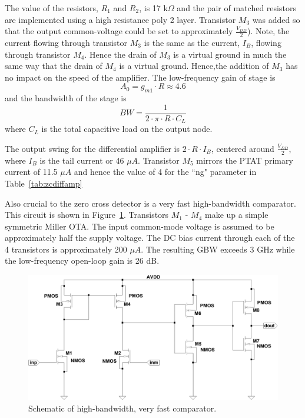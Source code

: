 \documentclass[12pt,oneside,final]{siuethesis}
\theoremstyle{definition}
\begin{document}
The value of the resistors, $R_1$ and $R_2$, is 17 k$\Omega$ and the pair of matched resistors are implemented using a high resistance poly 2 layer. Transistor $M_3$ was added so that the output common-voltage could be set to approximately $\frac{V_{DD}}{2}$). Note, the current flowing through transistor $M_3$ is the same as the current, $I_B$, flowing through transistor $M_4$. Hence the drain of $M_3$ is a virtual ground in much the same way that the drain of $M_4$ is a virtual ground. Hence,the addition of $M_3$ has no impact on the speed of the amplifier. The low-frequency gain of stage is
\begin{equation}
A_0 = g_{m1} \cdot R \approx 4.6
\end{equation}
and the bandwidth of the stage is 
\begin{equation}
BW = \frac{1}{2 \cdot \pi \cdot R \cdot C_L}
\end{equation}
where $C_L$ is the total capacitive load on the output node. 
\par The output swing for the differential amplifier is $ 2 \cdot R \cdot I_B$, centered around $\frac{V_{DD}}{2}$, where $I_B$ is the tail current or 46 $\mu A$.  Transistor $M_5$ mirrors the PTAT primary current of 11.5 $\mu A$ and hence the value of 4 for the ``ng" parameter in Table~\ref{tab:zcdiffamp}
\par Also crucial to the zero cross detector is a very fast high-bandwidth comparator. This circuit is shown in Figure~\ref{fig:zccomp}. Transistors $M_1$ - $M_4$ make up a simple symmetric Miller OTA. The input common-mode voltage is assumed to be approximately half the supply voltage. The DC bias current through each of the 4 transistors is approximately 200 $\mu A$.  The resulting GBW exceeds 3 GHz while the low-frequency open-loop gain is 26 dB.  

\begin{figure}[htbp!]
	\centering
 	\includegraphics[scale=0.6,keepaspectratio=true]{../Design_Reports/CFD_circuit_report/images/zc_cmp.pdf}
 	\caption{Schematic of high-bandwidth, very fast comparator.}
 	\label{fig:zccomp}
\end{figure}
\end{document}
